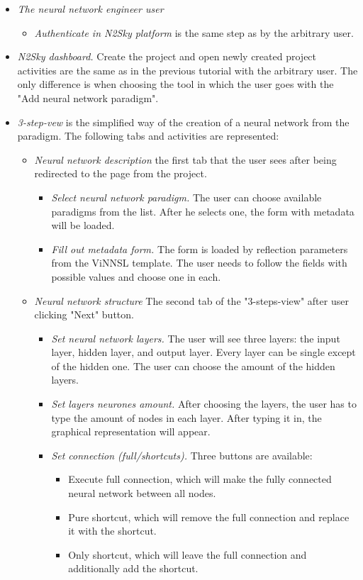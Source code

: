 \begin{itemize}
\item \emph{The neural network engineer user} 
\begin{itemize}
\item \emph{Authenticate in N2Sky platform} is the same step as by the arbitrary user.
\end{itemize}
\item \emph{N2Sky dashboard.} Create the project and open newly created project activities are the same as in the previous tutorial with the arbitrary user. The only difference is when choosing the tool in which the user goes with the "Add neural network paradigm".  
\item \emph{3-step-vew} is the simplified way of the creation of a neural network from the paradigm. The following tabs and activities are represented:
\begin{itemize}
\item \emph{Neural network description} the first tab that the user sees after being redirected to the page from the project. 
\begin{itemize}
\item \emph{Select neural network paradigm.} The user can choose available paradigms from the list. After he selects one, the form with metadata will be loaded.
\item \emph{Fill out metadata form.} The form is loaded by reflection parameters from the ViNNSL template. The user needs to follow the fields with possible values and choose one in each. 
\end{itemize}
\item \emph{Neural network structure} The second tab of the "3-steps-view" after user clicking "Next" button.
\begin{itemize}
\item \emph{Set neural network layers.} The user will see three layers: the input layer, hidden layer, and output layer. Every layer can be single except of the hidden one. The user can choose the amount of the hidden layers.
\item \emph{Set layers neurones amount.} After choosing the layers, the user has to type the amount of nodes in each layer. After typing it in, the graphical representation will appear.
\item \emph{Set connection (full/shortcuts).} Three buttons are available: 
\begin{itemize}
\item Execute full connection, which will make the fully connected neural network between all nodes.
\item Pure shortcut, which will remove the full connection and replace it with the shortcut.
\item Only shortcut, which will leave the full connection and additionally add the shortcut.
\end{itemize}


\end{itemize}
\end{itemize}
\end{itemize}
